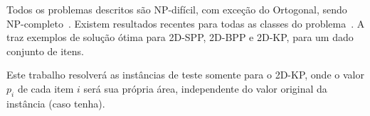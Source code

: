 Todos os problemas descritos são NP-difícil, com exceção do Ortogonal, sendo NP-completo~\cite{2DPackLib}.
Existem resultados recentes para todas as classes do problema~\cite{
    cote2014combinatorial,delorme2017logic,velasco2019improved,martin2020models,mrad2015arc,
    cintra2008algorithms,furini2016modeling}.
A  traz exemplos de solução ótima para 2D-SPP, 2D-BPP e 2D-KP,
para um dado conjunto de itens.



Este trabalho resolverá as instâncias de teste somente para o 2D-KP, onde o valor $p_i$ de cada
item $i$ será sua própria área, independente do valor original da instância (caso tenha).
